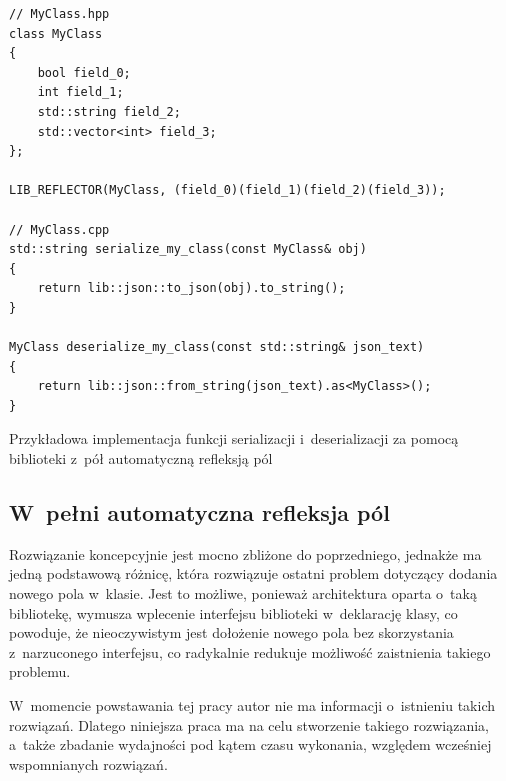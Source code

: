 \documentclass[12pt]{article}
\newcommand{\n}{\newline}
\begin{document}
{{{				\begin{captioned}[H]
					\begin{lstlisting}[frame=single]
// MyClass.hpp
class MyClass
{
	bool field_0;
	int field_1;
	std::string field_2;
	std::vector<int> field_3;
};

LIB_REFLECTOR(MyClass, (field_0)(field_1)(field_2)(field_3));

// MyClass.cpp
std::string serialize_my_class(const MyClass& obj)
{
	return lib::json::to_json(obj).to_string();
}

MyClass deserialize_my_class(const std::string& json_text)
{
	return lib::json::from_string(json_text).as<MyClass>();
}
					\end{lstlisting}
					\caption{Przykładowa implementacja funkcji serializacji i~deserializacji za pomocą biblioteki z~pół automatyczną refleksją pól}
					\label{half_automatic_example}
				\end{captioned}
			}
		}

		{
			\subsection{W~pełni automatyczna refleksja pól}

			Rozwiązanie koncepcyjnie jest mocno zbliżone do poprzedniego, jednakże ma jedną podstawową różnicę, która rozwiązuje ostatni
			problem dotyczący dodania nowego pola w~klasie. Jest to możliwe, ponieważ architektura oparta o~taką bibliotekę, wymusza wplecenie
			interfejsu biblioteki w~deklarację klasy, co powoduje, że nieoczywistym jest dołożenie nowego pola bez skorzystania z~narzuconego interfejsu, co
			radykalnie redukuje możliwość zaistnienia takiego problemu.\n

			W~momencie powstawania tej pracy autor nie ma informacji o~istnieniu takich rozwiązań. Dlatego niniejsza praca ma na celu
			stworzenie takiego rozwiązania, a~także zbadanie wydajności pod kątem czasu wykonania, względem wcześniej wspomnianych rozwiązań.
		}
	}
\end{document}
